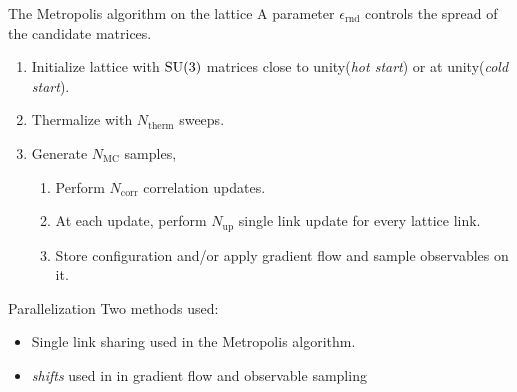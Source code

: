 \documentclass[10pt,show notes on second screen]{beamer}
\begin{document}
\begin{frame}{The Metropolis algorithm on the lattice}
A parameter $\epsilon_\mathrm{rnd}$ controls the spread of the candidate matrices.
\begin{enumerate}
    \item Initialize lattice with $\mathrm{SU}(3)$ matrices close to unity(\textit{hot start}) or at unity(\textit{cold start}).
    \item Thermalize with $N_\mathrm{therm}$ sweeps.
    \item Generate $N_\mathrm{MC}$ samples,
    \begin{enumerate}[i]
        \item Perform $N_\mathrm{corr}$ correlation updates.
        \item At each update, perform $N_\mathrm{up}$ single link update for every lattice link.
        \item Store configuration and/or apply gradient flow and sample observables on it.
    \end{enumerate}
\end{enumerate}
\end{frame}

\begin{frame}{Parallelization}
Two methods used:
\begin{itemize}
    \item Single link sharing used in the Metropolis algorithm.
    \item \textit{shifts} used in in gradient flow and observable sampling
\end{itemize}
\end{frame}
\end{document}
